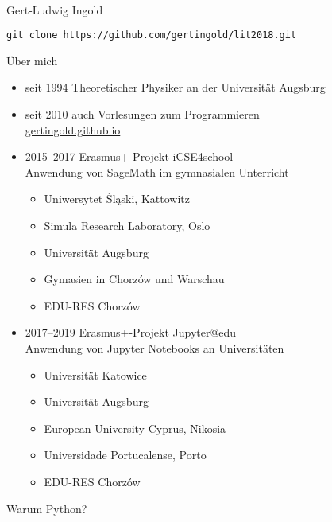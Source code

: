 \documentclass[t, utf8, 10pt]{beamer}
\begin{document}
\begin{frame}
 \vspace{4truecm}
 \begin{center}
  \\[0.3truecm]
  {\large Gert-Ludwig Ingold}

  \vspace{2truecm}
  \texttt{\normalsize git clone https://github.com/gertingold/lit2018.git}
 \end{center}
\end{frame}

\begin{frame}{Über mich}
 \begin{itemize}
  \item seit 1994 Theoretischer Physiker an der Universität Augsburg
  \item seit 2010 auch Vorlesungen zum Programmieren\\
	\url{gertingold.github.io}
  \item 2015--2017 Erasmus+-Projekt iCSE4school\quad
        \\
	Anwendung von SageMath im gymnasialen Unterricht
        \begin{itemize}
	 \item Uniwersytet Śląski, Kattowitz
	 \item Simula Research Laboratory, Oslo
	 \item Universität Augsburg
	 \item Gymasien in Chorzów und Warschau
	 \item EDU-RES Chorzów
	\end{itemize}
  \item 2017--2019 Erasmus+-Projekt Jupyter@edu\quad
        \\
	Anwendung von Jupyter Notebooks an Universitäten
        \begin{itemize}
	 \item Universität Katowice
	 \item Universität Augsburg
         \item European University Cyprus, Nikosia
	 \item Universidade Portucalense, Porto
	 \item EDU-RES Chorzów
	\end{itemize}
 \end{itemize}
\end{frame}

\begin{frame}{Warum Python?}
\end{frame}
\end{document}
